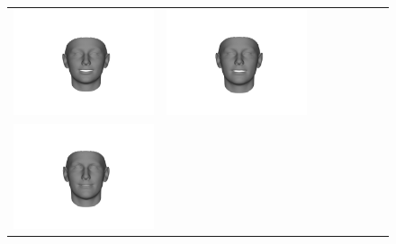 \begin{figure}[t!]
\begin{center}
{\begin{tabular}{ @{}c@{}c@{}c@{}c@{}c@{}c@{}c@{}c@{}}
\includegraphics[trim=400 180 370 230,clip,width=\VaryingShapeFigWid]{img/Basis/pred_shape_31_pos.jpg} &
\includegraphics[trim=400 180 370 230,clip,width=\VaryingShapeFigWid]{img/Basis/pred_shape_135_pos.jpg} &
\\
\includegraphics[trim=400 180 370 230,clip,width=\VaryingShapeFigWid]{img/Basis/pred_shape_133_neg.jpg} &

\end{tabular}}
\end{center}
\end{figure}
